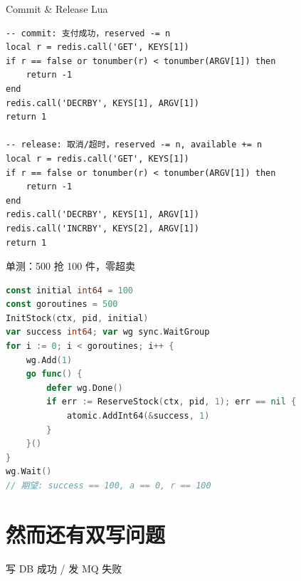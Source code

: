 \begin{frame}[fragile]{Commit \& Release Lua}
\begin{lstlisting}[language=LuaRedis,firstnumber=48,
  caption={\srcnote{repository/cache/inventory.go:48--66}}]
-- commit: 支付成功，reserved -= n
local r = redis.call('GET', KEYS[1])
if r == false or tonumber(r) < tonumber(ARGV[1]) then
    return -1
end
redis.call('DECRBY', KEYS[1], ARGV[1])
return 1

-- release: 取消/超时，reserved -= n, available += n
local r = redis.call('GET', KEYS[1])
if r == false or tonumber(r) < tonumber(ARGV[1]) then
    return -1
end
redis.call('DECRBY', KEYS[1], ARGV[1])
redis.call('INCRBY', KEYS[2], ARGV[1])
return 1
\end{lstlisting}
\end{frame}

\begin{frame}[fragile]{单测：500 抢 100 件，零超卖}
\begin{lstlisting}[language=Go,firstnumber=52,
  caption={\srcnote{repository/cache/inventory\_test.go:52--82}}]
const initial int64 = 100
const goroutines = 500
InitStock(ctx, pid, initial)
var success int64; var wg sync.WaitGroup
for i := 0; i < goroutines; i++ {
    wg.Add(1)
    go func() {
        defer wg.Done()
        if err := ReserveStock(ctx, pid, 1); err == nil {
            atomic.AddInt64(&success, 1)
        }
    }()
}
wg.Wait()
// 期望: success == 100, a == 0, r == 100
\end{lstlisting}
\end{frame}

\section{然而还有双写问题}

\begin{frame}{写 DB 成功 / 发 MQ 失败}
\end{frame}

